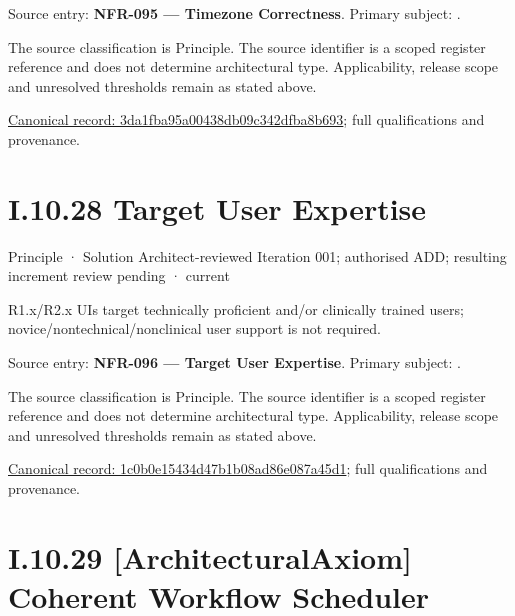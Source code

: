 Source entry: \textbf{NFR-095 — Timezone Correctness}. Primary subject: \texttt{}.



The source classification is Principle. The source identifier is a scoped register reference and does not determine architectural type. Applicability, release scope and unresolved thresholds remain as stated above.


{\footnotesize \href{../../../../../../../../continuum/motivation/principle/3da1fba95a00438db09c342dfba8b693.md}{Canonical record: 3da1fba95a00438db09c342dfba8b693}; full qualifications and provenance.}\par
\section*{I.10.28 Target User Expertise}
\label{navigation:I.10.28}

\label{element:1c0b0e15434d47b1b08ad86e087a45d1}
{\small Principle · Solution Architect-reviewed Iteration 001; authorised ADD; resulting increment review pending · current}\par

R1.x/R2.x UIs target technically proficient and/or clinically trained users; novice/nontechnical/nonclinical user support is not required.



Source entry: \textbf{NFR-096 — Target User Expertise}. Primary subject: \texttt{}.



The source classification is Principle. The source identifier is a scoped register reference and does not determine architectural type. Applicability, release scope and unresolved thresholds remain as stated above.


{\footnotesize \href{../../../../../../../../continuum/motivation/principle/1c0b0e15434d47b1b08ad86e087a45d1.md}{Canonical record: 1c0b0e15434d47b1b08ad86e087a45d1}; full qualifications and provenance.}\par
\section*{I.10.29 [ArchitecturalAxiom] Coherent Workflow Scheduler}
\label{navigation:I.10.29}

